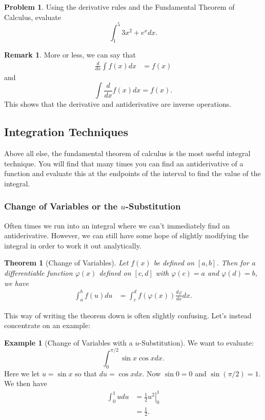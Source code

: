 \documentclass[12pt]{article}
\newtheorem{theorem}{Theorem}[section]
\theoremstyle{definition}
\newtheorem{example}{Example}[section]
\newtheorem{remark}{Remark}[section]
\newtheorem{problem}{Problem}[section]
\begin{document}
\begin{problem}
Using the derivative rules and the Fundamental Theorem of Calculus, evaluate
\[
\int_1^5 3x^2+e^x dx.
\]
\end{problem}

\begin{remark}
More or less, we can say that
\begin{align*}
    \frac{d}{dx} \int f(x) dx &= f(x)
\end{align*}
and
\[
\int \frac{d}{dx}f(x)dx=f(x).
\]
This shows that the derivative and antiderivative are inverse operations.
\end{remark}

\subsection{Integration Techniques}

Above all else, the fundamental theorem of calculus is the most useful integral technique. You will find that many times you can find an antiderivative of a function and evaluate this at the endpoints of the interval to find the value of the integral.  

\subsubsection{Change of Variables or the $u$-Substitution}

Often times we run into an integral where we can't immediately find an antiderivative.  However, we can still have some hope of slightly modifying the integral in order to work it out analytically.

\begin{theorem}[Change of Variables]
Let $f(x)$ be defined on $[a,b]$.  Then for a differentiable function $\varphi(x)$ defined on $[c,d]$ with $\varphi(c)=a$ and $\varphi(d)=b$, we have
\begin{align*}
    \int_a^b f(u)du &= \int_c^d f(\varphi(x))\frac{d\varphi}{dx}dx.
\end{align*}
\end{theorem}

This way of writing the theorem down is often slightly confusing.  Let's instead concentrate on an example:

\begin{example}[Change of Variables with a $u$-Substitution]
We want to evaluate:
\[
\int_0^{\pi/2} \sin x \cos x dx.
\]
Here we let $u=\sin x$ so that $du=\cos x dx$.  Now $\sin 0=0$ and $\sin (\pi/2) = 1$.  We then have
\begin{align*}
    \int_0^1 udu &= \left. \frac{1}{2}u^2 \right|_0^1\\
    &= \frac{1}{2}.
\end{align*}
\end{example}
\end{document}
